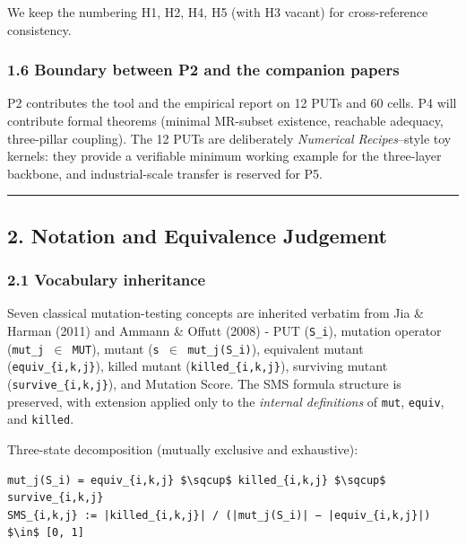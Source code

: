\documentclass[review,12pt,authoryear]{elsarticle}
\begin{document}
We keep the numbering H1, H2, H4, H5 (with H3 vacant) for
cross-reference consistency.

\subsubsection{1.6 Boundary between P2 and the companion
papers}\label{boundary-between-p2-and-the-companion-papers}

P2 contributes the tool and the empirical report on 12 PUTs and 60
cells. P4 will contribute formal theorems (minimal MR-subset existence,
reachable adequacy, three-pillar coupling). The 12 PUTs are deliberately
\emph{Numerical Recipes}--style toy kernels: they provide a verifiable
minimum working example for the three-layer backbone, and
industrial-scale transfer is reserved for P5.

\begin{center}\rule{0.5\linewidth}{0.5pt}\end{center}

\subsection{2. Notation and Equivalence
Judgement}\label{notation-and-equivalence-judgement}

\subsubsection{2.1 Vocabulary inheritance}\label{vocabulary-inheritance}

Seven classical mutation-testing concepts are inherited verbatim from
Jia \& Harman (2011) and Ammann \& Offutt (2008) - PUT (\texttt{S\_i}),
mutation operator (\texttt{mut\_j\ $\in$\ MUT}), mutant
(\texttt{s\textquotesingle{}\ $\in$\ mut\_j(S\_i)}), equivalent mutant
(\texttt{equiv\_\{i,k,j\}}), killed mutant (\texttt{killed\_\{i,k,j\}}),
surviving mutant (\texttt{survive\_\{i,k,j\}}), and Mutation Score. The
SMS formula structure is preserved, with extension applied only to the
\emph{internal definitions} of \texttt{mut}, \texttt{equiv}, and
\texttt{killed}.

Three-state decomposition (mutually exclusive and exhaustive):

\begin{verbatim}
mut_j(S_i) = equiv_{i,k,j} $\sqcup$ killed_{i,k,j} $\sqcup$ survive_{i,k,j}
SMS_{i,k,j} := |killed_{i,k,j}| / (|mut_j(S_i)| − |equiv_{i,k,j}|)  $\in$ [0, 1]
\end{verbatim}
\end{document}
